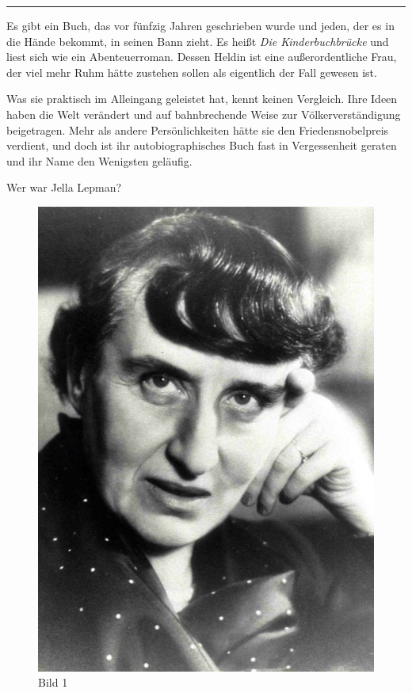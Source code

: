 \documentclass[a4paper,
fontsize=11pt,
oneside,
numbers=noperiodatend,
parskip=half-,
bibliography=totoc,
final
]{scrartcl}
\begin{document}
\begin{center}\rule{3in}{0.4pt}\end{center}

Es gibt ein Buch, das vor fünfzig Jahren geschrieben wurde und jeden,
der es in die Hände bekommt, in seinen Bann zieht. Es heißt \emph{Die
Kinderbuchbrücke} und liest sich wie ein Abenteuerroman. Dessen Heldin
ist eine außerordentliche Frau, der viel mehr Ruhm hätte zustehen sollen
als eigentlich der Fall gewesen ist.~

Was sie praktisch im Alleingang geleistet hat, kennt keinen Vergleich.
Ihre Ideen haben die Welt verändert und auf bahnbrechende Weise zur
Völkerverständigung beigetragen. Mehr als andere Persönlichkeiten hätte
sie den Friedensnobelpreis verdient, und doch ist ihr autobiographisches
Buch fast in Vergessenheit geraten und ihr Name den Wenigsten geläufig.

Wer war Jella Lepman?

\begin{figure}[htbp]
\centering
\includegraphics{img/Bild1.jpg}
\caption{Bild 1}
\end{figure}
\end{document}
